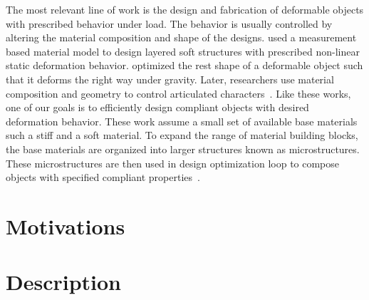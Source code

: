 The most relevant line of work is the design and fabrication of deformable objects with prescribed behavior under load.
The behavior is usually controlled by altering the material
composition and shape of the designs.
\citet{Bickel:2010:DAF} used a measurement based material model to design 
layered soft structures with prescribed non-linear static deformation behavior.
\citet{Chen:2014:ANM} optimized the rest shape of a deformable object such that 
it deforms the right way under gravity.
Later, researchers use material composition and geometry to control 
articulated characters~\citep{Bickel:2012,Skouras13Computational}.
Like these works, one of our goals is to efficiently design compliant objects 
with desired deformation behavior. These work assume a small set of available 
base materials such a stiff and a soft material.
To expand the range of material building blocks, the base materials are 
organized into larger structures known as microstructures.
These microstructures are then used in design optimization loop to 
compose objects with specified compliant 
properties~\citep{Schumacher:2015,Panetta:2015,Zhu:2017:TTO}.

\section{Motivations}


\section{Description}\label{ch1:desc}


\subsection{}


\subsection{}

\section{}


\subsection{}

\subsection{}

\section{}

\subsection{}

\subsection{}
